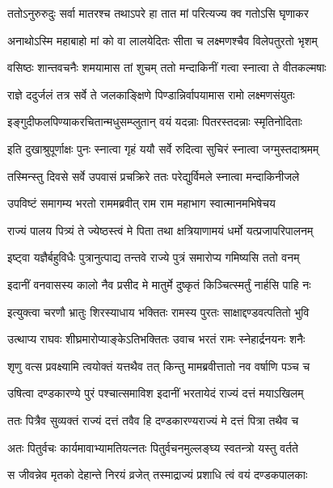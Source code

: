 \twolineshloka
{ततोऽनुरुरुदुः सर्वा मातरश्च तथाऽपरे}
{हा तात मां परित्यज्य क्व गतोऽसि घृणाकर} %

\twolineshloka
{अनाथोऽस्मि महाबाहो मां को वा लालयेदितः}
{सीता च लक्ष्मणश्चैव विलेपतुरतो भृशम्} %

\twolineshloka
{वसिष्ठः शान्तवचनैः शमयामास तां शुचम्}
{ततो मन्दाकिनीं गत्वा स्नात्वा ते वीतकल्मषाः} %

\twolineshloka
{राज्ञे ददुर्जलं तत्र सर्वे ते जलकाङ्क्षिणे}
{पिण्डान्निर्वापयामास रामो लक्ष्मणसंयुतः} %

\twolineshloka
{इङ्गुदीफलपिण्याकरचितान्मधुसम्प्लुतान्}
{वयं यदन्नाः पितरस्तदन्नाः स्मृतिनोदिताः} %

\twolineshloka
{इति दुखाश्रुपूर्णाक्षः पुनः स्नात्वा गृहं ययौ}
{सर्वे रुदित्वा सुचिरं स्नात्वा जग्मुस्तदाश्रमम्} %

\twolineshloka
{तस्मिन्स्तु दिवसे सर्वे उपवासं प्रचक्रिरे}
{ततः परेद्युर्विमले स्नात्वा मन्दाकिनीजले} %

\twolineshloka
{उपविष्टं समागम्य भरतो राममब्रवीत्}
{राम राम महाभाग स्वात्मानमभिषेचय} %

\twolineshloka
{राज्यं पालय पित्र्यं ते ज्येष्ठस्त्वं मे पिता तथा}
{क्षत्रियाणामयं धर्मो यत्प्रजापरिपालनम्} %

\twolineshloka
{इष्ट्वा यज्ञैर्बहुविधैः पुत्रानुत्पाद्य तन्तवे}
{राज्ये पुत्रं समारोप्य गमिष्यसि ततो वनम्} %

\twolineshloka
{इदानीं वनवासस्य कालो नैव प्रसीद मे}
{मातुर्मे दुष्कृतं किञ्चित्स्मर्तुं नार्हसि पाहि नः} %

\twolineshloka
{इत्युक्त्वा चरणौ भ्रातुः शिरस्याधाय भक्तितः}
{रामस्य पुरतः साक्षाद्दण्डवत्पतितो भुवि} %

\twolineshloka
{उत्थाप्य राघवः शीघ्रमारोप्याङ्केऽतिभक्तितः}
{उवाच भरतं रामः स्नेहार्द्रनयनः शनैः} %

\twolineshloka
{शृणु वत्स प्रवक्ष्यामि त्वयोक्तं यत्तथैव तत्}
{किन्तु मामब्रवीत्तातो नव वर्षाणि पञ्च च} %

\twolineshloka
{उषित्वा दण्डकारण्ये पुरं पश्चात्समाविश}
{इदानीं भरतायेदं राज्यं दत्तं मयाऽखिलम्} %

\twolineshloka
{ततः पित्रैव सुव्यक्तं राज्यं दत्तं तवैव हि}
{दण्डकारण्यराज्यं मे दत्तं पित्रा तथैव च} %

\twolineshloka
{अतः पितुर्वचः कार्यमावाभ्यामतियत्नतः}
{पितुर्वचनमुल्लङ्घ्य स्वतन्त्रो यस्तु वर्तते} %

\twolineshloka
{स जीवन्नेव मृतको देहान्ते निरयं व्रजेत्}
{तस्माद्राज्यं प्रशाधि त्वं वयं दण्डकपालकाः} %

